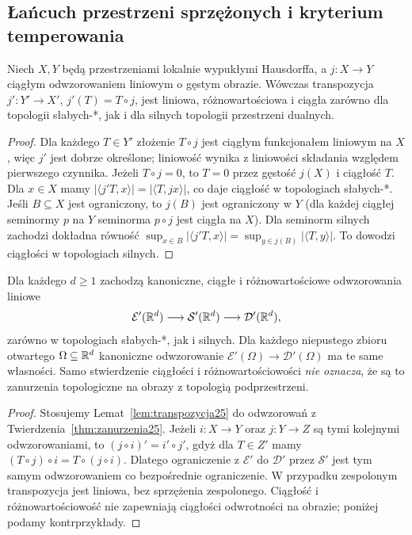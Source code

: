 \subsection{Łańcuch przestrzeni sprzężonych i kryterium temperowania}

\begin{lemat}
\label{lem:transpozycja25}
Niech $X,Y$ będą przestrzeniami lokalnie wypukłymi
Hausdorffa, a $j:X\to Y$ ciągłym odwzorowaniem liniowym
o gęstym obrazie. Wówczas transpozycja
$j':Y'\to X'$, $j'(T)=T\circ j$, jest liniowa,
różnowartościowa i ciągła zarówno dla topologii słabych-*, jak i dla
silnych topologii przestrzeni dualnych.
\end{lemat}
\begin{proof}
Dla każdego $T\in Y'$ złożenie $T\circ j$ jest ciągłym
funkcjonałem liniowym na $X$, więc $j'$ jest dobrze
określone; liniowość wynika z liniowości składania
względem pierwszego czynnika. Jeżeli $T\circ j=0$,
to $T=0$ przez gęstość $j(X)$ i ciągłość $T$.
Dla $x\in X$ mamy
$|\langle j'T,x\rangle|=|\langle T,jx\rangle|$,
co daje ciągłość w topologiach słabych-*.
Jeśli $B\subseteq X$ jest ograniczony, to $j(B)$ jest
ograniczony w $Y$ (dla każdej ciągłej seminormy $p$
na $Y$ seminorma $p\circ j$ jest ciągła na $X$).
Dla seminorm silnych zachodzi dokładna równość
$\sup_{x\in B}|\langle j'T,x\rangle|
= \sup_{y\in j(B)}|\langle T,y\rangle|$.
To dowodzi ciągłości w topologiach silnych.
\end{proof}

\begin{wniosek}
\label{cor:dual-lancuch25}
Dla każdego $d\ge1$ zachodzą kanoniczne, ciągłe i
różnowartościowe odwzorowania liniowe
\[
 \mathcal E'(\mathbb R^d)\longrightarrow\mathcal S'(\mathbb R^d)
 \longrightarrow\mathcal D'(\mathbb R^d),
\]
zarówno w topologiach słabych-*, jak i silnych.
Dla każdego niepustego zbioru otwartego $\Omega\subseteq\mathbb R^d$
kanoniczne odwzorowanie
$\mathcal E'(\Omega)\to\mathcal D'(\Omega)$
ma te same własności. Samo stwierdzenie ciągłości i
różnowartościowości \emph{nie oznacza}, że są to zanurzenia
topologiczne na obrazy z topologią podprzestrzeni.
\end{wniosek}
\begin{proof}
Stosujemy Lemat~\ref{lem:transpozycja25} do odwzorowań
z Twierdzenia~\ref{thm:zanurzenia25}. Jeżeli $i:X\to Y$
oraz $j:Y\to Z$ są tymi kolejnymi odwzorowaniami,
to $(j\circ i)'=i'\circ j'$, gdyż dla $T\in Z'$
mamy $(T\circ j)\circ i=T\circ(j\circ i)$.
Dlatego ograniczenie z $\mathcal E'$ do $\mathcal D'$
przez $\mathcal S'$ jest tym samym odwzorowaniem co
bezpośrednie ograniczenie. W przypadku zespolonym
transpozycja jest liniowa, bez sprzężenia zespolonego.
Ciągłość i różnowartościowość nie zapewniają ciągłości
odwrotności na obrazie; poniżej podamy kontrprzykłady.
\end{proof}
